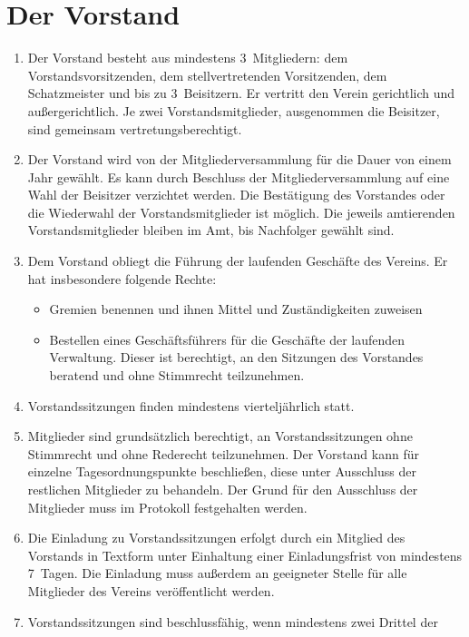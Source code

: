 \documentclass[a4paper,12pt]{scrartcl}
\begin{document}
\section{Der Vorstand}
\begin{enumerate}
  \item Der Vorstand besteht aus mindestens 3~Mitgliedern: dem
    Vorstandsvorsitzenden, dem stellvertretenden Vorsitzenden, dem Schatzmeister
    und bis zu 3~Beisitzern. Er vertritt den Verein gerichtlich und
    außergerichtlich. Je zwei Vorstandsmitglieder, ausgenommen die Beisitzer, 
    sind gemeinsam vertretungsberechtigt.
  \item Der Vorstand wird von der Mitgliederversammlung für die Dauer von einem
    Jahr gewählt. Es kann durch Beschluss der Mitgliederversammlung auf eine
    Wahl der Beisitzer verzichtet werden. Die Bestätigung des Vorstandes oder
    die Wiederwahl der Vorstandsmitglieder ist möglich. Die jeweils amtierenden
    Vorstandsmitglieder bleiben im Amt, bis Nachfolger gewählt sind.
  \item Dem Vorstand obliegt die Führung der laufenden Geschäfte des Vereins. Er
    hat insbesondere folgende Rechte:
    \begin{itemize}
      \item Gremien benennen und ihnen Mittel und Zuständigkeiten zuweisen
      \item Bestellen eines Geschäftsführers für die Geschäfte der laufenden
        Verwaltung. Dieser ist berechtigt, an den Sitzungen des Vorstandes
        beratend und ohne Stimmrecht teilzunehmen.
    \end{itemize}
  \item Vorstandssitzungen finden mindestens vierteljährlich statt.
  \item Mitglieder sind grundsätzlich berechtigt, an Vorstandssitzungen ohne
    Stimmrecht und ohne Rederecht teilzunehmen. Der Vorstand kann für einzelne
    Tagesordnungspunkte beschließen, diese unter Ausschluss der restlichen
    Mitglieder zu behandeln. Der Grund für den Ausschluss der Mitglieder muss im
    Protokoll festgehalten werden.
  \item Die Einladung zu Vorstandssitzungen erfolgt durch ein Mitglied des
    Vorstands in Textform
    unter Einhaltung einer Einladungsfrist von mindestens 7~Tagen. Die Einladung
    muss außerdem an geeigneter Stelle für alle Mitglieder des Vereins
    veröffentlicht werden.
  \item Vorstandssitzungen sind beschlussfähig, wenn mindestens zwei Drittel der

\end{enumerate}
\end{document}
